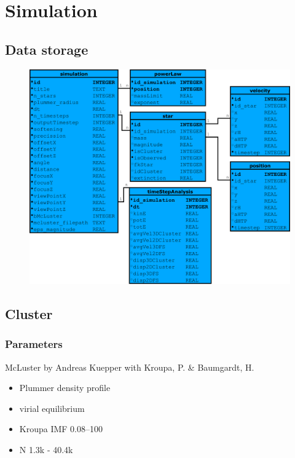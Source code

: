 \documentclass{beamer}
\begin{document}
\section{Simulation}

\subsection{Data storage}

\begin{frame}
\begin{figure}
\centering
\includegraphics[width=\textwidth,height=0.8\textheight,keepaspectratio]{Images/ERD.pdf}
\end{figure}
\end{frame}


\subsection{Cluster}

\begin{frame}
\frametitle{Parameters}
McLuster by Andreas Kuepper with Kroupa, P. \& Baumgardt, H.
\\[2ex]
\begin{itemize}
\item<1-> Plummer density profile
\item<2-> virial equilibrium
\item<3-> Kroupa IMF \SIrange{0.08}{100}{\solarmass}
\item<6-> N 1.3k - 40.4k
\end{itemize}

\end{frame}
\end{document}
